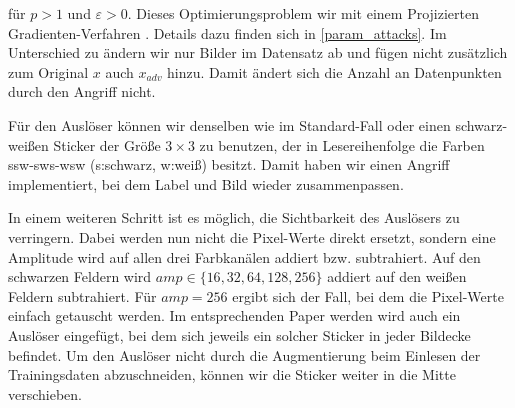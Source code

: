 \documentclass[11pt,a4paper]{article}
\numberwithin{equation}{section}
\begin{document}
	für $p >1 $ und $\varepsilon > 0$. Dieses Optimierungsproblem wir mit einem Projizierten Gradienten-Verfahren \cite{madry2017towards}. Details dazu finden sich in \autoref{param_attacks}. Im Unterschied zu \cite{labelconsistent} ändern wir nur Bilder im Datensatz ab und fügen nicht zusätzlich zum Original $x$ auch $x_{adv}$ hinzu. Damit ändert sich die Anzahl an Datenpunkten durch den Angriff nicht.
	
	Für den Auslöser können wir denselben wie im Standard-Fall oder einen schwarz-weißen Sticker der Größe $3\times 3$ zu benutzen, der in Lesereihenfolge die Farben ssw-sws-wsw (s:schwarz, w:weiß) besitzt. Damit haben wir einen Angriff implementiert, bei dem Label und Bild wieder zusammenpassen.
	
	In einem weiteren Schritt ist es möglich, die Sichtbarkeit des Auslösers zu verringern. Dabei werden nun nicht die Pixel-Werte direkt ersetzt, sondern eine Amplitude wird auf allen drei Farbkanälen addiert bzw. subtrahiert. Auf den schwarzen Feldern wird $amp \in \lbrace 16,32,64,128,256 \rbrace$ addiert auf den weißen Feldern subtrahiert. Für $amp=256$ ergibt sich der Fall, bei dem die Pixel-Werte einfach getauscht werden.
	Im entsprechenden Paper werden wird auch ein Auslöser eingefügt, bei dem sich jeweils ein solcher Sticker in jeder Bildecke befindet. Um den Auslöser nicht durch die Augmentierung beim Einlesen der Trainingsdaten abzuschneiden, können wir die Sticker weiter in die Mitte verschieben.
	
\end{document}
